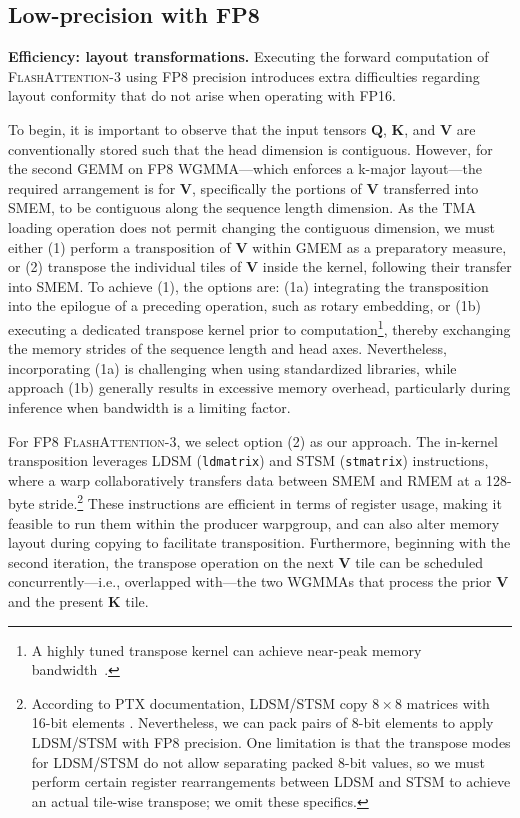 \subsection{Low-precision with FP8}
\label{sec:algofp8}

\textbf{Efficiency: layout transformations.} Executing the forward computation of \textsc{FlashAttention-3} using FP8 precision introduces extra difficulties regarding layout conformity that do not arise when operating with FP16.

To begin, it is important to observe that the input tensors $\mathbf{Q}$, $\mathbf{K}$, and $\mathbf{V}$ are conventionally stored such that the head dimension is contiguous. However, for the second GEMM on FP8 WGMMA—which enforces a k-major layout—the required arrangement is for $\mathbf{V}$, specifically the portions of $\mathbf{V}$ transferred into SMEM, to be contiguous along the sequence length dimension. As the TMA loading operation does not permit changing the contiguous dimension, we must either (1) perform a transposition of $\mathbf{V}$ within GMEM as a preparatory measure, or (2) transpose the individual tiles of $\mathbf{V}$ inside the kernel, following their transfer into SMEM. To achieve (1), the options are: (1a) integrating the transposition into the epilogue of a preceding operation, such as rotary embedding, or (1b) executing a dedicated transpose kernel prior to computation\footnote{A highly tuned transpose kernel can achieve near-peak memory bandwidth~\citep{colfax_cutlass_transpose_2024}.}, thereby exchanging the memory strides of the sequence length and head axes. Nevertheless, incorporating (1a) is challenging when using standardized libraries, while approach (1b) generally results in excessive memory overhead, particularly during inference when bandwidth is a limiting factor.

For FP8 \textsc{FlashAttention-3}, we select option (2) as our approach. The in-kernel transposition leverages LDSM (\verb|ldmatrix|) and STSM (\verb|stmatrix|) instructions, where a warp collaboratively transfers data between SMEM and RMEM at a 128-byte stride.\footnote{According to PTX documentation, LDSM/STSM copy $8 \times 8$ matrices with 16-bit elements \cite[\S 9.7.13.4.15-16]{ptx}. Nevertheless, we can pack pairs of 8-bit elements to apply LDSM/STSM with FP8 precision. One limitation is that the transpose modes for LDSM/STSM do not allow separating packed 8-bit values, so we must perform certain register rearrangements between LDSM and STSM to achieve an actual tile-wise transpose; we omit these specifics.} These instructions are efficient in terms of register usage, making it feasible to run them within the producer warpgroup, and can also alter memory layout during copying to facilitate transposition. Furthermore, beginning with the second iteration, the transpose operation on the next $\mathbf{V}$ tile can be scheduled concurrently—i.e., overlapped with—the two WGMMAs that process the prior $\mathbf{V}$ and the present $\mathbf{K}$ tile.

